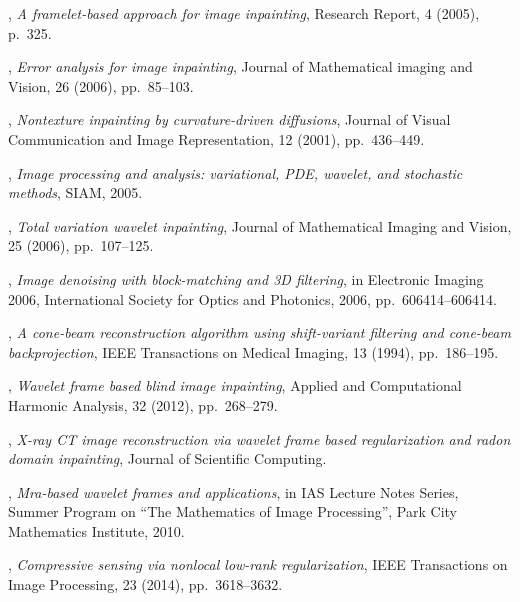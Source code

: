 \documentclass[letterpaper,10pt]{article}
\begin{document}
\begin{thebibliography}{10}
, {\em {A framelet-based approach for
  image inpainting}}, Research Report, 4 (2005), p.~325.

, {\em Error analysis for image inpainting},
  Journal of Mathematical imaging and Vision, 26 (2006), pp.~85--103.

, {\em Nontexture inpainting by curvature-driven
  diffusions}, Journal of Visual Communication and Image Representation, 12
  (2001), pp.~436--449.

\leavevmode\vrule height 2pt depth -1.6pt width 23pt, {\em Image processing and
  analysis: variational, PDE, wavelet, and stochastic methods}, SIAM, 2005.

, {\em {Total variation wavelet
  inpainting}}, Journal of Mathematical Imaging and Vision, 25 (2006),
  pp.~107--125.

, {\em Image denoising
  with block-matching and 3{D} filtering}, in Electronic Imaging 2006,
  International Society for Optics and Photonics, 2006, pp.~606414--606414.

, {\em A cone-beam reconstruction algorithm using
  shift-variant filtering and cone-beam backprojection}, IEEE Transactions on
  Medical Imaging, 13 (1994), pp.~186--195.

, {\em Wavelet frame based blind
  image inpainting}, Applied and Computational Harmonic Analysis, 32 (2012),
  pp.~268--279.

, {\em X-ray {CT} image reconstruction via
  wavelet frame based regularization and radon domain inpainting}, Journal of
  Scientific Computing.

, {\em Mra-based wavelet frames and applications}, in
  IAS Lecture Notes Series, Summer Program on ``The Mathematics of Image
  Processing'', Park City Mathematics Institute, 2010.

, {\em Compressive sensing via
  nonlocal low-rank regularization}, IEEE Transactions on Image Processing, 23
  (2014), pp.~3618--3632.


\end{thebibliography}
\end{document}
